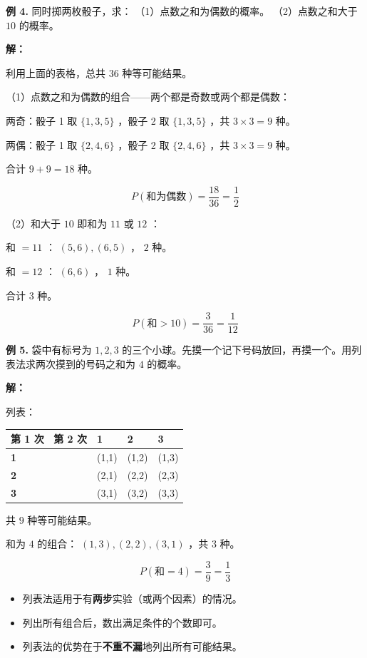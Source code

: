 \begin{workedexamples}


\textbf{例 4.} 同时掷两枚骰子，求：
（1）点数之和为偶数的概率。
（2）点数之和大于 $10$ 的概率。

\textbf{解：}

利用上面的表格，总共 $36$ 种等可能结果。

（1）点数之和为偶数的组合——两个都是奇数或两个都是偶数：

两奇：骰子 1 取 $\{1,3,5\}$ ，骰子 2 取 $\{1,3,5\}$ ，共 $3 \times 3 = 9$ 种。

两偶：骰子 1 取 $\{2,4,6\}$ ，骰子 2 取 $\{2,4,6\}$ ，共 $3 \times 3 = 9$ 种。

合计 $9 + 9 = 18$ 种。

\[
P(\text{和为偶数}) = \frac{18}{36} = \frac{1}{2}
\]


（2）和大于 $10$ 即和为 $11$ 或 $12$ ：

和 $= 11$ ： $(5,6), (6,5)$ ， $2$ 种。

和 $= 12$ ： $(6,6)$ ， $1$ 种。

合计 $3$ 种。

\[
P(\text{和} > 10) = \frac{3}{36} = \frac{1}{12}
\]


\textbf{例 5.} 袋中有标号为 $1, 2, 3$ 的三个小球。先摸一个记下号码放回，再摸一个。用列表法求两次摸到的号码之和为 $4$ 的概率。

\textbf{解：}

列表：

\begin{center}
\begin{tabular}{llll}
\toprule
第 1 次 \ 第 2 次 & 1 & 2 & 3 \\
\midrule
\textbf{1} & (1,1) & (1,2) & (1,3) \\
\textbf{2} & (2,1) & (2,2) & (2,3) \\
\textbf{3} & (3,1) & (3,2) & (3,3) \\
\bottomrule
\end{tabular}
\end{center}


共 $9$ 种等可能结果。

和为 $4$ 的组合： $(1,3), (2,2), (3,1)$ ，共 $3$ 种。

\[
P(\text{和} = 4) = \frac{3}{9} = \frac{1}{3}
\]


\end{workedexamples}

\begin{keytakeaway}


\begin{itemize}
  \item 列表法适用于有\textbf{两步}实验（或两个因素）的情况。
  \item 列出所有组合后，数出满足条件的个数即可。
  \item 列表法的优势在于\textbf{不重不漏}地列出所有可能结果。
\end{itemize}


\end{keytakeaway}



